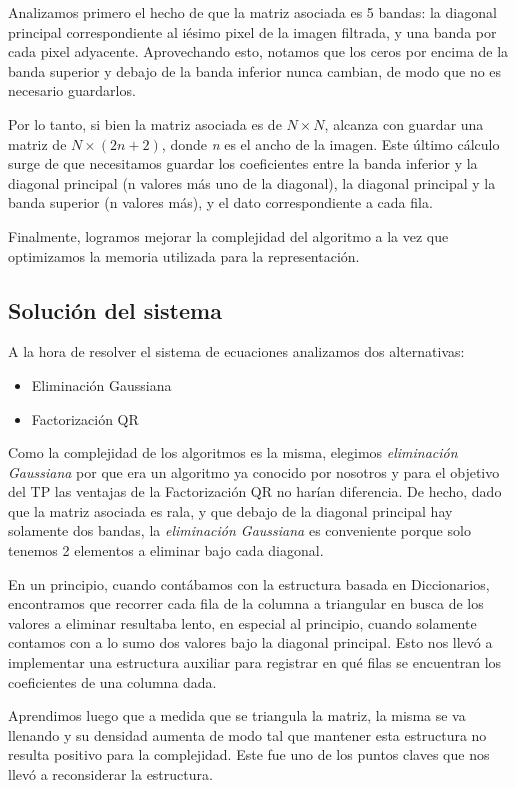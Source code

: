 \documentclass[a4paper]{article}
\begin{document}
Analizamos primero el hecho de que la matriz asociada es 5 bandas: la diagonal principal correspondiente al iésimo pixel de la imagen filtrada, y una banda por cada pixel adyacente.
Aprovechando esto, notamos que los ceros por encima de la banda superior y debajo de la banda inferior nunca cambian, de modo que no es necesario guardarlos.

Por lo tanto, si bien la matriz asociada es de $N \times N$, alcanza con guardar una matriz de $N \times (2n + 2)$, donde \textit{n} es el ancho de la imagen. Este último cálculo surge de que necesitamos guardar los coeficientes entre la banda inferior y la diagonal principal (n valores más uno de la diagonal), la diagonal principal y la banda superior (n valores más), y el dato correspondiente a cada fila.

Finalmente, logramos mejorar la complejidad del algoritmo a la vez que optimizamos la memoria utilizada para la representación.

\subsection{Solución del sistema}

A la hora de resolver el sistema de ecuaciones analizamos dos alternativas:
\begin{itemize}
	\item Eliminación Gaussiana
	\item Factorización QR
\end{itemize}


Como la complejidad de los algoritmos es la misma, elegimos \textit{eliminación Gaussiana} por que era un algoritmo ya conocido por nosotros y para el objetivo del TP las ventajas de la Factorización QR no harían diferencia. 
De hecho, dado que la matriz asociada es rala, y que debajo de la diagonal principal hay solamente dos bandas, la \textit{eliminación Gaussiana} es conveniente porque solo tenemos 2 elementos a eliminar bajo cada diagonal.

En un principio, cuando contábamos con la estructura basada en Diccionarios, encontramos que recorrer cada fila de la columna a triangular en busca de los valores a eliminar resultaba lento, en especial al principio, cuando solamente contamos con a lo sumo dos valores bajo la diagonal principal. Esto nos llevó a implementar una estructura auxiliar para registrar en qué filas se encuentran los coeficientes de una columna dada.

Aprendimos luego que a medida que se triangula la matriz, la misma se va llenando y su densidad aumenta de modo tal que mantener esta estructura no resulta positivo para la complejidad. Este fue uno de los puntos claves que nos llevó a reconsiderar la estructura.
\end{document}
